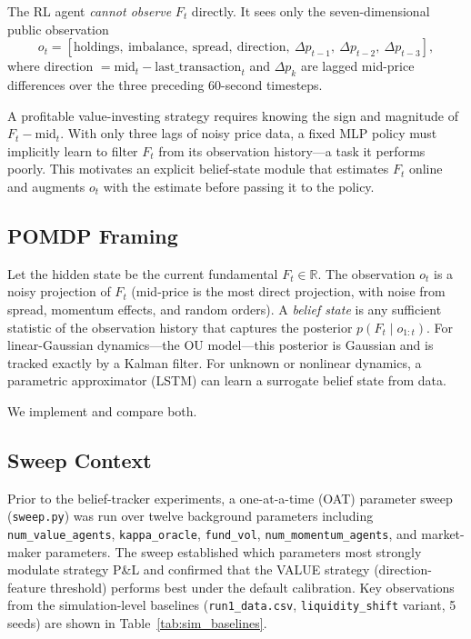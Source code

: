 \documentclass[11pt]{article}
\begin{document}
The RL agent \emph{cannot observe} $F_t$ directly.
It sees only the seven-dimensional public observation
\[
o_t = [\text{holdings},\ \text{imbalance},\ \text{spread},\
       \text{direction},\ \Delta p_{t-1},\ \Delta p_{t-2},\ \Delta p_{t-3}],
\]
where direction $= \text{mid}_t - \text{last\_transaction}_t$ and
$\Delta p_k$ are lagged mid-price differences over the three preceding
60-second timesteps.

A profitable value-investing strategy requires knowing the sign and magnitude
of $F_t - \text{mid}_t$.
With only three lags of noisy price data, a fixed MLP policy must implicitly
learn to filter $F_t$ from its observation history---a task it performs poorly.
This motivates an explicit belief-state module that estimates $F_t$ online and
augments $o_t$ with the estimate before passing it to the policy.

\subsection{POMDP Framing}

Let the hidden state be the current fundamental $F_t \in \mathbb{R}$.
The observation $o_t$ is a noisy projection of $F_t$ (mid-price is the most
direct projection, with noise from spread, momentum effects, and random orders).
A \emph{belief state} is any sufficient statistic of the observation history
that captures the posterior $p(F_t \mid o_{1:t})$.
For linear-Gaussian dynamics---the OU model---this posterior is Gaussian and is
tracked exactly by a Kalman filter.
For unknown or nonlinear dynamics, a parametric approximator (LSTM) can learn
a surrogate belief state from data.

We implement and compare both.

\subsection{Sweep Context}

Prior to the belief-tracker experiments, a one-at-a-time (OAT) parameter sweep
(\texttt{sweep.py}) was run over twelve background parameters including
\texttt{num\_value\_agents}, \texttt{kappa\_oracle}, \texttt{fund\_vol},
\texttt{num\_momentum\_agents}, and market-maker parameters.
The sweep established which parameters most strongly modulate strategy P\&L and
confirmed that the VALUE strategy (direction-feature threshold) performs best
under the default calibration.
Key observations from the simulation-level baselines (\texttt{run1\_data.csv},
\texttt{liquidity\_shift} variant, 5 seeds) are shown in
Table~\ref{tab:sim_baselines}.
\end{document}
